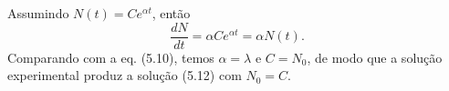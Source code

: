 Assumindo $N(t)=Ce^{\alpha t}$, então
\[\frac{dN}{dt}=\alpha Ce^{\alpha t}=\alpha N(t).
\]
Comparando com a eq. (5.10), temos $\alpha=\lambda$ e $C=N_{0}$, de modo que a solução experimental produz a solução (5.12) com $N_{0}=C$. 
